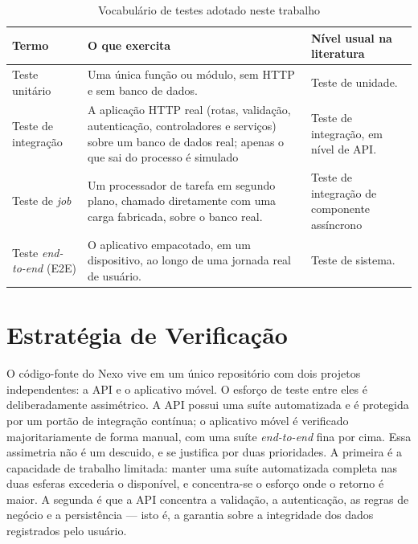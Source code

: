 \begin{table}[H]
\centering
\caption{Vocabulário de testes adotado neste trabalho}
\label{tab:test-vocab}
\small
\begin{tabular}{|p{2.8cm}|p{6.6cm}|p{4.2cm}|}
\hline
\textbf{Termo} &
\textbf{O que exercita} &
\textbf{Nível usual na literatura} \\

\hline

Teste unitário &
Uma única função ou módulo, sem HTTP e sem banco de dados. &
Teste de unidade. \\

\hline

Teste de integração &
A aplicação HTTP real (rotas, validação, autenticação, controladores
e serviços) sobre um banco de dados real; apenas o que sai do processo
é simulado &
Teste de integração, em nível de API. \\

\hline

Teste de \textit{job} &
Um processador de tarefa em segundo plano, chamado diretamente com uma carga
fabricada, sobre o banco real. &
Teste de integração de componente assíncrono \\

\hline

Teste \textit{end-to-end} (E2E) &
O aplicativo empacotado, em um dispositivo, ao longo de uma jornada real de
usuário. &
Teste de sistema. \\

\hline
\end{tabular}
\end{table}

\section{Estratégia de Verificação}\label{sec:test-strategy}

O código-fonte do Nexo vive em um único repositório com dois projetos
independentes: a API e o aplicativo móvel. O esforço de teste entre eles é
deliberadamente assimétrico. A API possui uma suíte automatizada e é protegida
por um portão de integração contínua; o aplicativo móvel é verificado
majoritariamente de forma manual, com uma suíte \textit{end-to-end} fina por
cima. Essa assimetria não é um descuido, e se justifica por duas prioridades.
A primeira é a capacidade de trabalho limitada: manter uma suíte automatizada
completa nas duas esferas excederia o disponível, e concentra-se o esforço onde
o retorno é maior. A segunda é que a API concentra a validação, a autenticação,
as regras de negócio e a persistência --- isto é, a garantia sobre a integridade
dos dados registrados pelo usuário.

